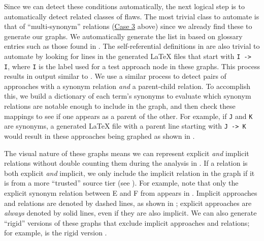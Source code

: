     Since we can detect these conditions automatically, the next logical step
    is to automatically detect related classes of flaws. The most trivial class
    to automate is that of ``multi-synonym'' relations
    (\hyperref[case-three]{Case 3} above) since we already find these to
    generate our graphs. We automatically generate the list in 
    based on glossary entries such as those found in
    . The self-referential definitions in
     are also trivial to automate by looking for lines in the
    generated \LaTeX{} files that start with \texttt{I -> I}, where \texttt{I}
    is the label used for a test approach node in these graphs. This process
    results in output similar to . We use a similar
    process to detect pairs of approaches with a synonym relation \emph{and} a
    parent-child relation. To accomplish this, we build a dictionary of each
    term's synonyms to evaluate which synonym relations are notable enough to
    include in the graph, and then check these mappings to see if one appears
    as a parent of the other. For example, if \texttt{J} and \texttt{K} are
    synonyms, a generated \LaTeX{} file with a parent line starting with
    \texttt{J -> K} would result in these approaches being graphed as shown in
    .

    \label{expAndImp}
    The visual nature of these graphs means we can represent explicit
    \emph{and} implicit relations without double counting them during the
    analysis in . If a relation is both explicit
    \emph{and} implicit, we only include the implicit relation in the graph
    if it is from a more ``trusted'' source tier (see ).
    For example, note that only the explicit synonym relation between E and F
    from  appears in .
    Implicit approaches and relations are denoted by dashed lines, as shown
    in ; explicit approaches are
    \emph{always} denoted by solid lines, even if they are also implicit.
    We can also generate ``rigid'' versions of these graphs that exclude
    implicit approaches and relations; for example,
     is the rigid version .

